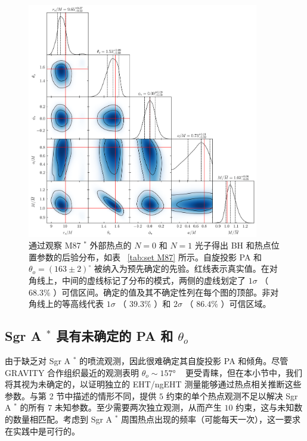 \documentclass[aps,reprint,superscriptaddress,nofootinbib,floatfix,longbibliography,preprintnumbers]{revtex4-1}
\begin{document}
   \begin{figure}
    \centering
    \includegraphics[width=0.9\textwidth]{figures/mc_M87_dpi800_compressed.png}
    \caption{通过观察 M87    $^*$    外部热点的    $N=0$    和    $N=1$    光子得出 BH 和热点位置参数的后验分布，如表~    \ref{tab:set M87}    所示。自旋投影 PA 和    $\theta_o = {(163\pm 2)}^\circ$    被纳入为预先确定的先验。红线表示真实值。在对角线上，中间的虚线标记了分布的模式，两侧的虚线划定了    $1\sigma$   （   $68.3 \% $   ）可信区间。确定的值及其不确定性列在每个图的顶部。非对角线上的等高线代表    $1\sigma$   （   $39.3 \% $   ）和    $2\sigma$   （   $86.4 \% $   ）可信区域。  }
    \label{fig:mc_M87}
\end{figure}    
   \subsection{Sgr A    $^*$    具有未确定的 PA 和    $\theta_o$     }    
   \label{subsec:SgrA}     

由于缺乏对 Sgr A    $^*$    的喷流观测，因此很难确定其自旋投影 PA 和倾角。尽管 GRAVITY 合作组织最近的观测表明    $\theta_o \sim \ang{157}$    ~    \cite{GRAVITY:2023avo}    更受青睐，但在本小节中，我们将其视为未确定的，以证明独立的 EHT/ngEHT 测量能够通过热点相关推断这些参数。与第 2 节中描述的情形不同，提供    $5$    约束的单个热点观测不足以解决 Sgr A    $^*$    的所有    $7$    未知参数。至少需要两次独立观测，从而产生    $10$    约束，这与未知数的数量相匹配。考虑到 Sgr A    $^*$    周围热点出现的频率（可能每天一次），这一要求在实践中是可行的。  
\end{document}
